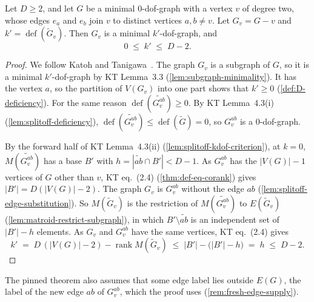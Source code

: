\begin{lemma}
  \label{lem:case-III-gap3-minimalKDof}
  \leanok
  Let $D \ge 2$, and let $G$ be a minimal $0$-dof-graph with a vertex $v$
  of degree two, whose edges $e_a$ and $e_b$ join $v$ to distinct
  vertices $a, b \neq v$. Let $G_v = G - v$ and
  $k' = \operatorname{def}(\tilde G_v)$. Then $G_v$ is a minimal
  $k'$-dof-graph, and
  \[
    0 \;\le\; k' \;\le\; D - 2.
  \]
\end{lemma}
\begin{proof}
  \leanok
  We follow Katoh and Tanigawa~\cite[p.~684]{katohTanigawa2011}. The
  graph $G_v$ is a subgraph of $G$, so it is a minimal $k'$-dof-graph by
  KT Lemma~3.3 (\cref{lem:subgraph-minimality}). It has the vertex $a$,
  so the partition of $V(G_v)$ into one part shows that $k' \ge 0$
  (\cref{def:D-deficiency}). For the same reason
  $\operatorname{def}(\widetilde{G_v^{ab}}) \ge 0$. By KT Lemma~4.3(i)
  (\cref{lem:splitoff-deficiency}),
  $\operatorname{def}(\widetilde{G_v^{ab}}) \le \operatorname{def}(\tilde G) = 0$,
  so $G_v^{ab}$ is a $0$-dof-graph.

  By the forward half of KT Lemma~4.3(ii)
  (\cref{lem:splitoff-kdof-criterion}), at $k = 0$,
  $M(\widetilde{G_v^{ab}})$ has a base $B'$ with
  $h = |\widetilde{ab} \cap B'| < D - 1$. As $G_v^{ab}$ has the
  $|V(G)| - 1$ vertices of $G$ other than $v$, KT eq.~(2.4)
  (\cref{thm:def-eq-corank}) gives $|B'| = D(|V(G)| - 2)$. The graph
  $G_v$ is $G_v^{ab}$ without the edge $ab$
  (\cref{lem:splitoff-edge-substitution}). So $M(\tilde G_v)$ is the
  restriction of $M(\widetilde{G_v^{ab}})$ to $E(\tilde G_v)$
  (\cref{lem:matroid-restrict-subgraph}), in which
  $B' \setminus \widetilde{ab}$ is an independent set of $|B'| - h$
  elements. As $G_v$ and $G_v^{ab}$ have the same vertices, KT
  eq.~(2.4) gives
  \[
    k' \;=\; D\,(|V(G)| - 2) - \operatorname{rank} M(\tilde G_v)
    \;\le\; |B'| - \bigl(|B'| - h\bigr) \;=\; h \;\le\; D - 2.
  \]
\end{proof}

\begin{fmlnote}
  The pinned theorem also assumes that some edge label lies outside
  $E(G)$, the label of the new edge $ab$ of $G_v^{ab}$, which the proof
  uses (\cref{rem:fresh-edge-supply}).
\end{fmlnote}

